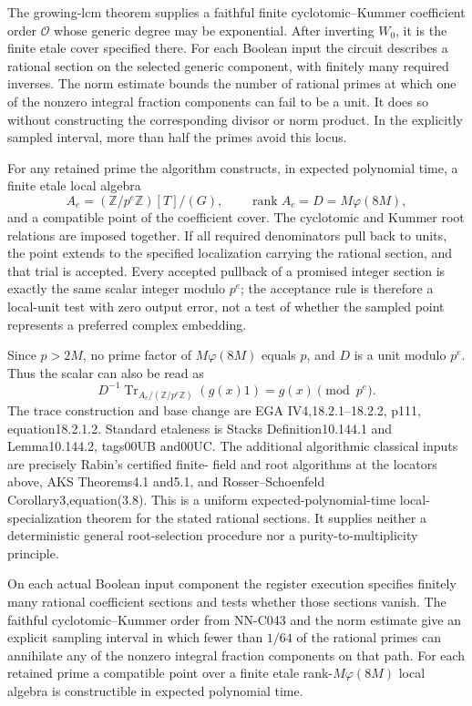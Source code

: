 \begin{geometricstatement}[NN-C043]
The growing-lcm theorem supplies a faithful finite cyclotomic--Kummer
coefficient order $\mathcal O$ whose generic degree may be exponential.
After inverting $W_0$, it is the finite etale cover specified there.
For each Boolean input the circuit describes a rational section on
the selected generic component, with finitely many required inverses.
The norm estimate bounds the number of rational primes at which one
of the nonzero integral fraction components can fail to be a unit.
It does so without constructing the corresponding divisor or norm
product. In the explicitly sampled interval, more than half the
primes avoid this locus.

For any retained prime the algorithm constructs, in expected
polynomial time, a finite etale local algebra
\[
 A_e=(\mathbb Z/p^e\mathbb Z)[T]/(G),
 \qquad \operatorname{rank}A_e=D=M\varphi(8M),
\]
and a compatible point of the coefficient cover. The cyclotomic and
Kummer root relations are imposed together. If all required
denominators pull back to units, the point extends to the specified
localization carrying the rational section, and that trial is
accepted. Every accepted pullback of a promised integer section is
exactly the same scalar integer modulo $p^e$; the acceptance rule is
therefore a local-unit test with zero output error, not a test of
whether the sampled point represents a preferred complex embedding.

Since $p>2M$, no prime factor of $M\varphi(8M)$ equals $p$, and $D$
is a unit modulo $p^e$. Thus the scalar can also be read as
\[
       D^{-1}\operatorname{Tr}_{A_e/(\mathbb Z/p^e\mathbb Z)}(g(x)1)
                            =g(x)\pmod{p^e}.
\]
The trace construction and base change are EGA IV4,18.2.1--18.2.2,
p111, equation18.2.1.2. Standard etaleness is Stacks
Definition10.144.1 and Lemma10.144.2, tags00UB and00UC. The additional
algorithmic classical inputs are precisely Rabin's certified finite-
field and root algorithms at the locators above, AKS Theorems4.1
and5.1, and Rosser--Schoenfeld Corollary3,equation(3.8).
This is a uniform expected-polynomial-time local-specialization
theorem for the stated rational sections. It supplies neither a
deterministic general root-selection procedure nor a
purity-to-multiplicity principle.

On each actual Boolean input component the register execution
specifies finitely many rational coefficient sections and tests
whether those sections vanish. The faithful cyclotomic--Kummer
order from NN-C043 and the norm estimate give an explicit sampling
interval in which fewer than $1/64$ of the rational primes can
annihilate any of the nonzero integral fraction components on that
path. For each retained prime a compatible point over a finite
etale rank-$M\varphi(8M)$ local algebra is constructible in expected
polynomial time.


\end{geometricstatement}
